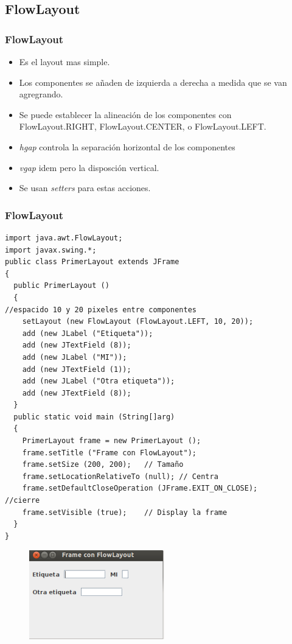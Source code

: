 \documentclass{beamer}
\begin{document}
\subsection{FlowLayout}
\begin{frame}
    \frametitle{FlowLayout}
\begin{itemize}[<+->]
\item Es el layout mas simple.
\item Los componentes se añaden de izquierda a derecha a medida que se van agregrando.
\item Se puede establecer la alineación de los componentes con \alert{FlowLayout.RIGHT, FlowLayout.CENTER, o FlowLayout.LEFT.}
\item \emph{hgap} controla la separación horizontal de los componentes
\item \emph{vgap} idem pero la disposción vertical.
\item Se usan \emph{setters} para estas acciones.
\end{itemize}
\end{frame}


\begin{frame}[fragile]
    \frametitle{FlowLayout}
    \begin{multicols}{2}
\begin{tiny}
\begin{verbatim}
import java.awt.FlowLayout;
import javax.swing.*;
public class PrimerLayout extends JFrame
{
  public PrimerLayout ()
  {
//espacido 10 y 20 pixeles entre componentes
    setLayout (new FlowLayout (FlowLayout.LEFT, 10, 20));
    add (new JLabel ("Etiqueta"));
    add (new JTextField (8));
    add (new JLabel ("MI"));
    add (new JTextField (1));
    add (new JLabel ("Otra etiqueta"));
    add (new JTextField (8));
  }
  public static void main (String[]arg)
  {
    PrimerLayout frame = new PrimerLayout ();
    frame.setTitle ("Frame con FlowLayout");
    frame.setSize (200, 200);   // Tamaño
    frame.setLocationRelativeTo (null); // Centra
    frame.setDefaultCloseOperation (JFrame.EXIT_ON_CLOSE);      //cierre
    frame.setVisible (true);    // Display la frame
  }
}
\end{verbatim}
\end{tiny}
\begin{figure}
\includegraphics[scale=0.7]{imagenes/primerlayout.png}
\end{figure}
\end{multicols}
\end{frame}
\end{document}
